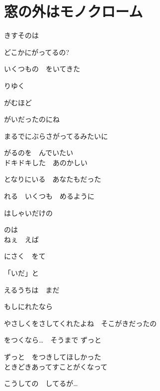 \section{ 窓の外はモノクローム}
\large{

きすそのは

どこかにがってるの?

いくつもの　をいてきた

りゆく　

がむほど

がいだったのにね

まるでにぶらさがってるみたいに

がるのを　んでいたい
\\

ドキドキした　あのかしい

となりにいる　あなたもだった

れる　いくつも　めるように

はしゃいだけの

のは
\\

ねぇ　えば

にさく　をて

「いだ」と

えるうちは　まだ

もしにれたなら

やさしくをさしてくれたよね　そこがきだったの

をつくなら…　そうまで ずっと

ずっと　をつきしてほしかった
\\

ときどきあってすことがくなって

こうしての　してるが…

}

